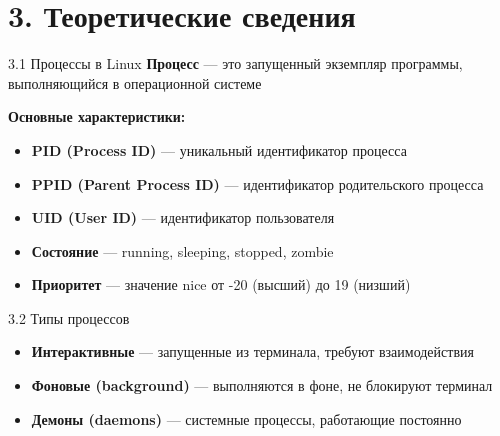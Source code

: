 \documentclass[
  ignorenonframetext,
  aspectratio=169,
  russian,
]{beamer}
\providecommand{\tightlist}{%
  \setlength{\itemsep}{0pt}\setlength{\parskip}{0pt}}
\begin{document}
\section{3. Теоретические
сведения}\label{ux442ux435ux43eux440ux435ux442ux438ux447ux435ux441ux43aux438ux435-ux441ux432ux435ux434ux435ux43dux438ux44f}

\begin{frame}{3.1 Процессы в Linux}
\label{ux43fux440ux43eux446ux435ux441ux441ux44b-ux432-linux}
\textbf{Процесс} --- это запущенный экземпляр программы, выполняющийся в
операционной системе

\textbf{Основные характеристики:}

\begin{itemize}[<+->]
\tightlist
\item
  \textbf{PID (Process ID)} --- уникальный идентификатор процесса
\item
  \textbf{PPID (Parent Process ID)} --- идентификатор родительского
  процесса
\item
  \textbf{UID (User ID)} --- идентификатор пользователя
\item
  \textbf{Состояние} --- running, sleeping, stopped, zombie
\item
  \textbf{Приоритет} --- значение nice от -20 (высший) до 19 (низший)
\end{itemize}
\end{frame}

\begin{frame}{3.2 Типы процессов}
\label{ux442ux438ux43fux44b-ux43fux440ux43eux446ux435ux441ux441ux43eux432}
\begin{itemize}[<+->]
\tightlist
\item
  \textbf{Интерактивные} --- запущенные из терминала, требуют
  взаимодействия
\item
  \textbf{Фоновые (background)} --- выполняются в фоне, не блокируют
  терминал
\item
  \textbf{Демоны (daemons)} --- системные процессы, работающие постоянно
\end{itemize}
\end{frame}
\end{document}

